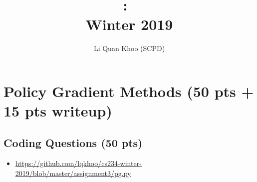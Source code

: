 \documentclass{article}
\title{
\vspace{-1in}
\textmd{\textbf{\hmwkClass:\ \hmwkTitle\\
Winter 2019}}}
\author{ Li Quan Khoo (SCPD) }
\date{} %
\begin{document}
\maketitle
\vspace{-.5in}


\section{Policy Gradient Methods (50 pts + 15 pts writeup)}

\subsection{Coding Questions (50 pts)}
\begin{itemize}
\item \url{https://github.com/lqkhoo/cs234-winter-2019/blob/master/assignment3/pg.py}
\end{itemize} 
\end{document}
